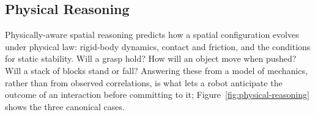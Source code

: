 
\subsection{Physical Reasoning}
\label{subsec:p3_s7_1_2}

Physically-aware spatial reasoning predicts how a spatial configuration evolves under physical law: rigid-body dynamics, contact and friction, and the conditions for static stability. Will a grasp hold? How will an object move when pushed? Will a stack of blocks stand or fall? Answering these from a model of mechanics, rather than from observed correlations, is what lets a robot anticipate the outcome of an interaction before committing to it; Figure~\ref{fig:physical-reasoning} shows the three canonical cases.

